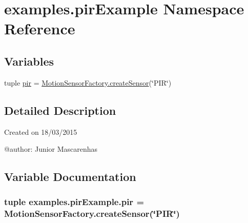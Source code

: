 \hypertarget{namespaceexamples_1_1pirExample}{}\section{examples.\+pir\+Example Namespace Reference}
\label{namespaceexamples_1_1pirExample}
\subsection*{Variables}
\begin{DoxyCompactItemize}
\item 
tuple \hyperlink{namespaceexamples_1_1pirExample_ace75b772e547819e1aa1ba203b2e79bd}{pir} = \hyperlink{classconcretefactory_1_1motionSensorFactory_1_1MotionSensorFactory_a34e03c8f0321aa4b610df0a504b82834}{Motion\+Sensor\+Factory.\+create\+Sensor}(\char`\"{}P\+I\+R\char`\"{})
\end{DoxyCompactItemize}


\subsection{Detailed Description}
\begin{DoxyVerb}Created on 18/03/2015

@author: Junior Mascarenhas
\end{DoxyVerb}
 

\subsection{Variable Documentation}
\hypertarget{namespaceexamples_1_1pirExample_ace75b772e547819e1aa1ba203b2e79bd}{}
\subsubsection[{pir}]{\setlength{\rightskip}{0pt plus 5cm}tuple examples.\+pir\+Example.\+pir = {\bf Motion\+Sensor\+Factory.\+create\+Sensor}(\char`\"{}P\+I\+R\char`\"{})}\label{namespaceexamples_1_1pirExample_ace75b772e547819e1aa1ba203b2e79bd}
